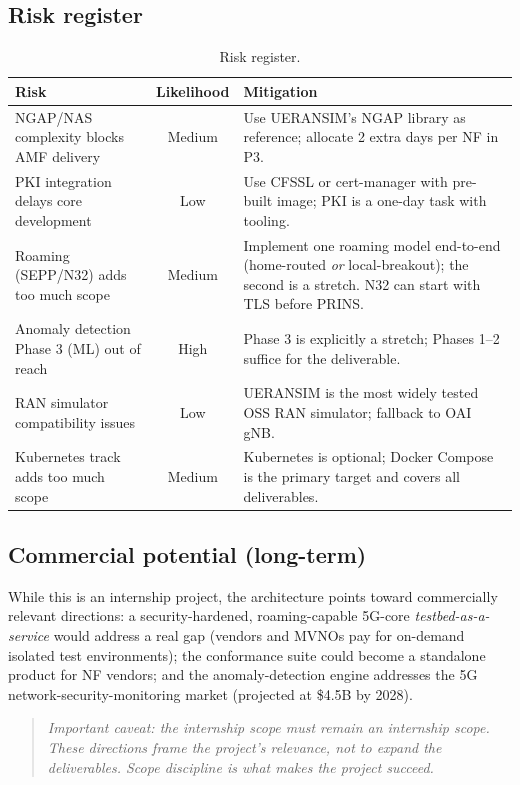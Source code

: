 \documentclass[11pt,a4paper]{report}
\begin{document}
\subsection{Risk register}
\begin{table}[h]
\centering
\footnotesize
\renewcommand{\arraystretch}{1.3}
\begin{tabularx}{\linewidth}{@{}X c X@{}}
\toprule
\textbf{Risk} & \textbf{Likelihood} & \textbf{Mitigation}\\
\midrule
NGAP/NAS complexity blocks AMF delivery & Medium &
  Use UERANSIM's NGAP library as reference; allocate 2 extra days per NF in P3.\\
PKI integration delays core development & Low &
  Use CFSSL or cert-manager with pre-built image; PKI is a one-day task with tooling.\\
Roaming (SEPP/N32) adds too much scope & Medium &
  Implement one roaming model end-to-end (home-routed \emph{or} local-breakout); the second
  is a stretch. N32 can start with TLS before PRINS.\\
Anomaly detection Phase 3 (ML) out of reach & High &
  Phase 3 is explicitly a stretch; Phases 1--2 suffice for the deliverable.\\
RAN simulator compatibility issues & Low &
  UERANSIM is the most widely tested OSS RAN simulator; fallback to OAI gNB.\\
Kubernetes track adds too much scope & Medium &
  Kubernetes is optional; Docker Compose is the primary target and covers all deliverables.\\
\bottomrule
\end{tabularx}
\caption{Risk register.}
\label{tab:risks}
\end{table}

\subsection{Commercial potential (long-term)}
While this is an internship project, the architecture points toward commercially relevant
directions: a security-hardened, roaming-capable 5G-core \emph{testbed-as-a-service} would
address a real gap (vendors and MVNOs pay for on-demand isolated test environments); the
conformance suite could become a standalone product for NF vendors; and the anomaly-detection
engine addresses the 5G network-security-monitoring market (projected at \$4.5B by 2028).

\begin{quote}\itshape
Important caveat: the internship scope must remain an internship scope. These directions
frame the project's relevance, not to expand the deliverables. Scope discipline is what
makes the project succeed.
\end{quote}
\end{document}
